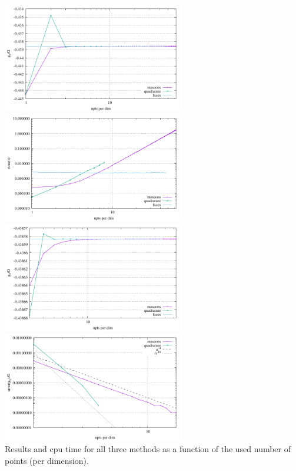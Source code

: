 \begin{center}
\includegraphics[width=8cm]{python_codes/fieldstone_113/results/hex_test1/gx.pdf}
\includegraphics[width=8cm]{python_codes/fieldstone_113/results/hex_test1/time.pdf}\\
\includegraphics[width=8cm]{python_codes/fieldstone_113/results/hex_test1/gx2.pdf}
\includegraphics[width=8cm]{python_codes/fieldstone_113/results/hex_test1/gx3.pdf}\\
{\captionfont Results and cpu time for all three methods as a function of 
the used number of points (per dimension).}
\end{center}

